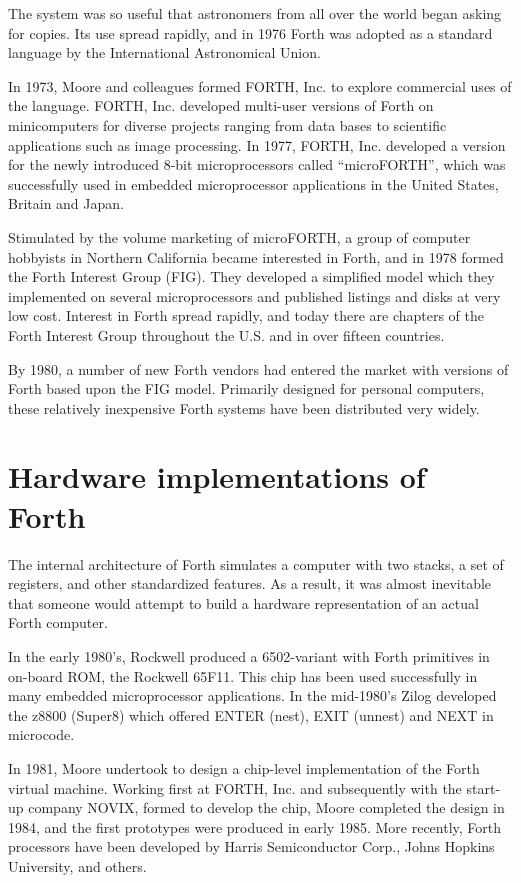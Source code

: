 The system was so useful that astronomers from all over the world
began asking for copies. Its use spread rapidly, and in 1976 Forth
was adopted as a standard language by the International Astronomical
Union.

In 1973, Moore and colleagues formed FORTH, Inc. to explore
commercial uses of the language. FORTH, Inc. developed multi-user
versions of Forth on minicomputers for diverse projects ranging from
data bases to scientific applications such as image processing.
In 1977, FORTH, Inc. developed a version for the newly introduced
8-bit microprocessors called ``microFORTH'', which was successfully
used in embedded microprocessor applications in the United States,
Britain and Japan.

Stimulated by the volume marketing of microFORTH, a group of
computer hobbyists in Northern California became interested in Forth,
and in 1978 formed the Forth Interest Group (FIG). They developed a
simplified model which they implemented on several microprocessors
and published listings and disks at very low cost. Interest in Forth
spread rapidly, and today there are chapters of the Forth Interest
Group throughout the U.S. and in over fifteen countries.

By 1980, a number of new Forth vendors had entered the market with
versions of Forth based upon the FIG model. Primarily designed for
personal computers, these relatively inexpensive Forth systems have
been distributed very widely.


\section{Hardware implementations of Forth} %

The internal architecture of Forth simulates a computer with two
stacks, a set of registers, and other standardized features. As a
result, it was almost inevitable that someone would attempt to build
a hardware representation of an actual Forth computer.

In the early 1980's, Rockwell produced a 6502-variant with Forth
primitives in on-board ROM, the Rockwell 65F11. This chip has been
used successfully in many embedded microprocessor applications. In
the mid-1980's Zilog developed the z8800 (Super8) which offered
ENTER (nest), EXIT (unnest) and NEXT in microcode.

In 1981, Moore undertook to design a chip-level implementation of
the Forth virtual machine. Working first at FORTH, Inc. and
subsequently with the start-up company NOVIX, formed to develop the
chip, Moore completed the design in 1984, and the first prototypes
were produced in early 1985. More recently, Forth processors have
been developed by Harris Semiconductor Corp., Johns Hopkins
University, and others.


